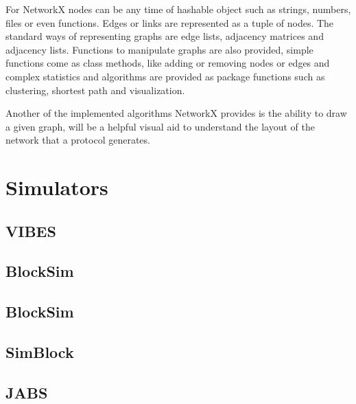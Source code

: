 For NetworkX nodes can be any time of hashable object such as strings, numbers,
files or even functions. Edges or links are represented as a tuple of nodes. The
standard ways of representing graphs are edge lists, adjacency matrices and adjacency
lists. Functions to manipulate graphs are also provided, simple functions come as class
methods, like adding or removing nodes or edges and complex statistics and algorithms
are provided as package functions such as clustering, shortest path and visualization.

Another of the implemented algorithms NetworkX provides is the ability to draw
a given graph, will be a helpful visual aid to understand the layout of the network
that a protocol generates.

\section{Simulators}
\label{sec:simulators}

\subsection{VIBES}
\label{subsec:vibes}

\subsection{BlockSim}
\label{subsec:blocksim1}

\subsection{BlockSim}
\label{subsec:blocksim2}

\subsection{SimBlock}
\label{subsec:simblock}

\subsection{JABS}
\label{subsec:jabs}